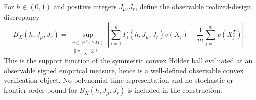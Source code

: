 For \(h\in(0,1)\) and positive integers \(J_\mu,J_r\), define the observable realized-design discrepancy
\[
B_X(h,J_\mu,J_r)=
\sup_{\substack{v\in\mathcal H^s(2M)\\ \|v\|_\infty\le1}}
\left|\sum_{i=1}^n\Gamma_i(h,J_\mu,J_r)v(X_i)-\frac1m\sum_{j=1}^m v(X_j^T)\right|.
\]
This is the support function of the symmetric convex Hölder ball evaluated at an observable signed empirical measure, hence is a well-defined observable convex verification object. No polynomial-time representation and no stochastic or frontier-order bound for \(B_X(h,J_\mu,J_r)\) is included in the construction.